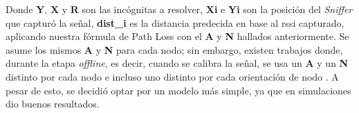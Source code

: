 Donde \textbf{Y}, \textbf{X} y \textbf{R} son las incógnitas a resolver, \textbf{Xi} e \textbf{Yi} son la posición del \textit{Sniffer} que capturó la señal, \textbf{dist\_i} es la distancia predecida en base al \acs{rssi} capturado, aplicando nuestra fórmula de Path Loss con el \textbf{A} y \textbf{N} hallados anteriormente. Se asume los mismos \textbf{A} y \textbf{N} para cada nodo; sin embargo, existen trabajos donde, durante la etapa \textit{offline}, es decir, cuando se calibra la señal, se usa un \textbf{A} y un \textbf{N} distinto por cada nodo e incluso uno distinto por cada orientación de nodo \cite{etter2019simulation}. A pesar de esto, se decidió optar por un modelo más simple, ya que en simulaciones dio buenos resultados.